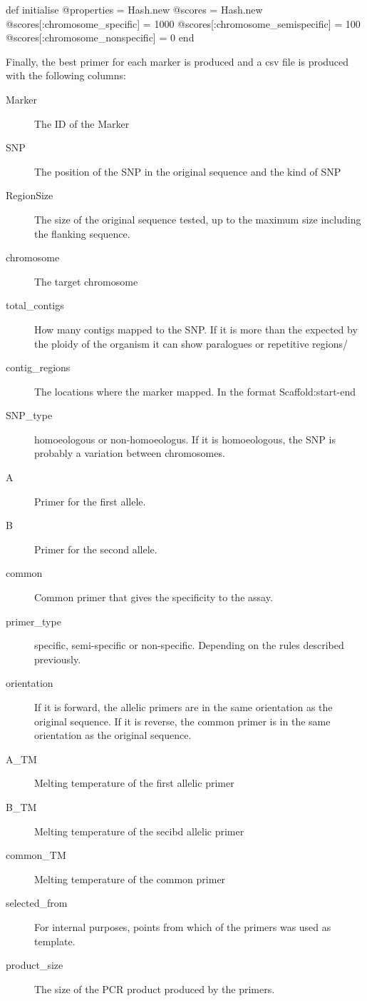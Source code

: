 \begin{code}[language=Ruby,caption={[\texttt{Bio::DB::Primer3::Primer3Record.initialize}]Initialisation of the \texttt{Bio::DB::Primer3::Primer3Record} class, including the default score weights}, label=lst:poly:defScore]
def initialise
  @properties = Hash.new
  @scores = Hash.new
  @scores[:chromosome_specific] = 1000
  @scores[:chromosome_semispecific] = 100
  @scores[:chromosome_nonspecific] = 0
end
\end{code}

Finally, the best primer for each marker is produced and a \acrshort{csv} file is produced with the following columns: 

\begin{description}
\item[Marker] The ID of the Marker
\item[SNP] The position of the SNP in the original sequence and the kind of SNP
\item[RegionSize] The size of the original sequence tested, up to the maximum size including the flanking sequence. 
\item[chromosome] The target chromosome
\item[total\_contigs] How many contigs mapped to the SNP. If it is more than the expected by the ploidy of the organism it can show paralogues or repetitive regions/
\item[contig\_regions] The locations where the marker mapped. In the format Scaffold:start-end
\item[SNP\_type] homoeologous or non-homoeologus. If it is homoeologous, the SNP is probably a variation between chromosomes. 
\item[A] Primer for the first allele.
\item[B] Primer for the second allele.
\item[common] Common primer that gives the specificity to the assay.
\item[primer\_type] specific, semi-specific or non-specific. Depending on the rules described previously. 
\item[orientation] If it is forward, the allelic primers are in the same orientation as the original sequence. If it is reverse, the common primer is in the same orientation as the original sequence.
\item[A\_TM] Melting temperature of the first allelic primer
\item[B\_TM] Melting temperature of the secibd allelic primer
\item[common\_TM] Melting temperature of the common primer
\item[selected\_from] For internal purposes, points from which of the primers was used as template. 
\item[product\_size] The size of the PCR product produced by the primers. 
\end{description}

